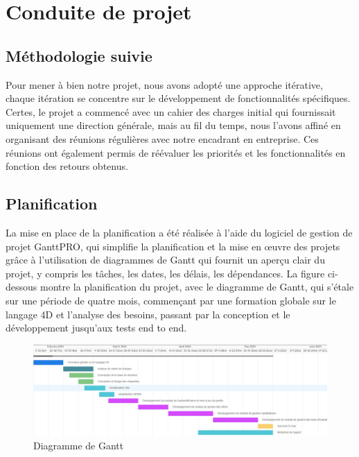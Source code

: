 \section{Conduite de projet}
\subsection{Méthodologie suivie}
Pour mener à bien notre projet, nous avons adopté une approche itérative, chaque itération se concentre sur le développement de 
fonctionnalités spécifiques. Certes, le projet a commencé avec un cahier des charges initial qui fournissait uniquement une direction 
générale, mais au fil du temps, nous l'avons affiné en organisant des réunions régulières avec notre encadrant en entreprise. Ces réunions 
ont également permis de réévaluer les priorités et les fonctionnalités en fonction des retours obtenus.

\subsection{Planification}
La mise en place de la planification a été réalisée à l’aide du logiciel de gestion de
projet GanttPRO, qui simplifie la planification et la mise en œuvre des projets grâce à
l’utilisation de diagrammes de Gantt qui fournit un aperçu clair du projet, y compris les
tâches, les dates, les délais, les dépendances.
La figure ci-dessous montre la planification du projet, avec le diagramme de Gantt,
qui s’étale sur une période de quatre mois, commençant par une formation globale sur
le langage 4D et l’analyse des besoins, passant par la conception et le développement
jusqu’aux tests end to end.

\begin{figure}[h]
    \centering
    \includegraphics[scale=0.6]{Images/gantt.jpg} %
    \caption{Diagramme de Gantt}
    \label{fig:gantt}
\end{figure}

